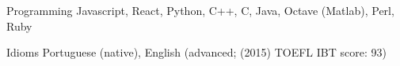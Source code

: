 \documentclass[11pt, a4paper]{awesome-cv-res}
\begin{document}

\begin{cvskills}
\cvskill
{Programming} %
{Javascript, React, Python, C++, C, Java, Octave (Matlab), Perl, Ruby}

\cvskill
{Idioms} %
{Portuguese (native), English (advanced; (2015) TOEFL IBT score: 93)} %
\end{cvskills}
\end{document}

